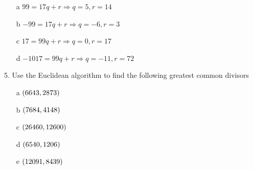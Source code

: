 \begin{mdframed}[style=darkAnswer,frametitle={Joe Starr}]
\begin{itemize}
    \item [a] {$99=17q+r\Rightarrow q=5, r=14$}
    \item [b] {$-99=17q+r\Rightarrow q=-6, r=3$}
    \item [c] {$17=99q+r\Rightarrow q=0, r=17$}
    \item [d] {$-1017=99q+r\Rightarrow q=-11, r=72$}
\end{itemize}
\end{mdframed}

\newpage
\begin{mdframed}[style=darkQuesion]
5.    Use the Euclidean algorithm to find the following greatest common divisors
\begin{multicols}{2}
    \begin{itemize}
        \item [a] {$\left(6643,2873\right)$}
        \item [b] {$\left(7684,4148\right)$}
        \item [c] {$\left(26460,12600\right)$}
        \item [d] {$\left(6540,1206\right)$}
        \item [e] {$\left(12091,8439\right)$}
    \end{itemize}
\end{multicols}
\end{mdframed}


